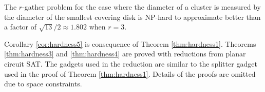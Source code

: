 \begin{theorem}\label{thm:hardness4}
The $r$-gather problem for the case where the diameter of a cluster is measured by the diameter of the smallest covering disk is NP-hard to approximate better than a factor of $\sqrt{13}/2 \approx 1.802$ when $r=3$.
\end{theorem}

Corollary \ref{cor:hardness5} is consequence of Theorem \ref{thm:hardness1}.  Theorems \ref{thm:hardness3} and \ref{thm:hardness4} are proved with reductions from planar circuit SAT.  The gadgets used in the reduction are similar to the splitter gadget used in the proof of Theorem \ref{thm:hardness1}.  Details of the proofs are omitted due to space constraints.





\pagebreak
